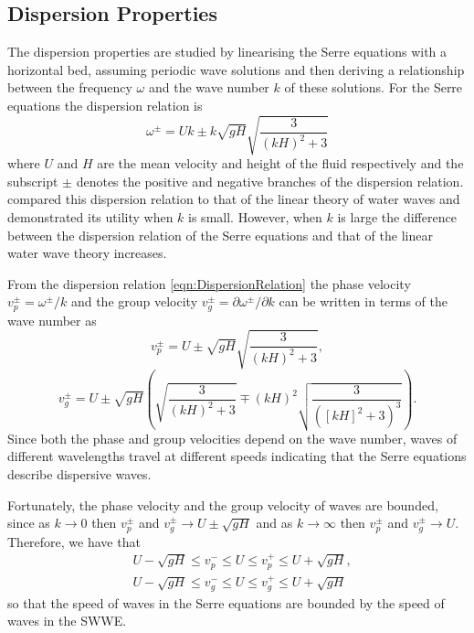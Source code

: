 \subsection{Dispersion Properties}
The dispersion properties are studied by linearising the Serre equations with a horizontal bed, assuming periodic wave solutions and then deriving a relationship between the frequency $\omega$ and the wave number $k$ of these solutions. For the Serre equations the dispersion relation \cite{Li-2014-169} is
\begin{equation}
\label{eqn:DispersionRelation}
\omega^\pm = Uk \pm k \sqrt{gH} \sqrt{\frac{3}{\left(kH\right)^2 + 3}}
\end{equation}
where $U$ and $H$ are the mean velocity and height of the fluid respectively and the subscript $\pm$ denotes the positive and negative branches of the dispersion relation. \citet{Barthelemy-2004-315} compared this dispersion relation to that of the linear theory of water waves and demonstrated its utility when $k$ is small. However, when $k$ is large the difference between the dispersion relation of the Serre equations and that of the linear water wave theory increases. 


From the dispersion relation \eqref{eqn:DispersionRelation} the phase velocity $v_p^\pm = \omega^\pm / k$  and the group velocity $v_g^\pm = \partial \omega^\pm / \partial  k$ can be written in terms of the wave number as
	\begin{equation*}
	\label{eqn:WaveVelocitiesPhase}
	v_p^\pm = U \pm \sqrt{gH}\sqrt{\frac{3}{\left(kH\right)^2 + 3}},
	\end{equation*}
	\begin{equation*}
	\label{eqn:WaveVelocitiesGroup}
	v_g^\pm = U \pm \sqrt{gH} \left(\sqrt{\frac{3}{\left(kH\right)^2 + 3}} \mp \left(kH\right)^2 \sqrt{\frac{3}{\left(\left[kH\right]^2 + 3 \right)^3}}\right).
	\end{equation*}
Since both the phase and group velocities depend on the wave number, waves of different wavelengths travel at different speeds indicating that the Serre equations describe dispersive waves.

Fortunately, the phase velocity and the group velocity of waves are bounded, since as $k \rightarrow 0$ then $v_p^\pm$ and $v_g^\pm \rightarrow U \pm \sqrt{gH}$ and as $k \rightarrow \infty$ then $v_p^\pm$ and $v_g^\pm \rightarrow U$. Therefore, we have that
\begin{subequations}
\begin{align}
&U - \sqrt{gH} \le v_p^- \le U \le v_p^+ \le U + \sqrt{gH}, \\
&U - \sqrt{gH} \le v_g^- \le U \le v_g^+ \le U + \sqrt{gH}
\end{align}
\label{eqn:WaveVelocitiesBound}
\end{subequations}
so that the speed of waves in the Serre equations are bounded by the speed of waves in the SWWE.

